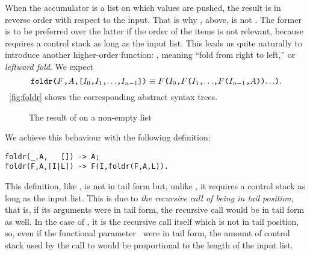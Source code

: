 When the accumulator is a list on which values are pushed, the result
is in reverse order with respect to the input. That is why
, above, is not . The former is to
be preferred over the latter if the order of the items is not
relevant, because  requires a control stack as long as
the input list. This leads us quite naturally to introduce another
higher\hyp{}order function: , meaning ``fold from
right to left,'' or \emph{leftward fold}. We expect
\[
\texttt{foldr(\(F\),\(A\),[\(I_0\),\(I_1\),\(\ldots\),\(I_{n-1}\)])}
\mathrel{\equiv}
\texttt{\(F\)(\(I_0\),\(F\)(\(I_1\),\(\ldots\),\(F\)(\(I_{n-1}\),\(A\)))\(\ldots\))}.
\]
\Fig~\vref{fig:foldr} shows the corresponding abstract syntax trees.
\begin{figure}
\centering
{}
\qquad
{}
\caption{The result of  on a non\hyp{}empty list
\label{fig:foldr}}
\end{figure}
We achieve this behaviour with the following definition:
\begin{verbatim}
foldr(_,A,   []) -> A;
foldr(F,A,[I|L]) -> F(I,foldr(F,A,L)).
\end{verbatim}
This definition, like , is not in tail form but,
unlike , it requires a control stack as long as the
input list. This is due to \emph{the recursive call of
   being in tail position}, that is, if its arguments
were in tail form, the recursive call would be in tail form as
well. In the case of , it is the recursive call
itself which is not in tail position, so, even if the functional
parameter~ were in tail form, the amount of control stack
used by the call to  would be proportional to the
length of the input list.

